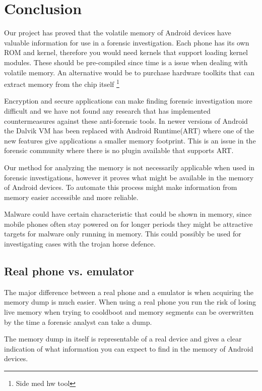 \section{Conclusion}
Our project has proved that the volatile memory of Android devices have valuable information for use 
in a forensic investigation. %
Each phone has its own ROM and kernel, therefore you would need kernels that support loading kernel 
modules. These should be pre-compiled since time is a issue when dealing with volatile memory. An 
alternative would be to purchase hardware toolkits that can extract memory from the chip itself 
\footnote{Side med hw tool} %

Encryption and secure applications can make finding forensic investigation more difficult and we have not found 
any research that has implemented countermeasures against these anti-forensic tools. In newer versions 
of Android the Dalvik VM has been replaced with Android Runtime(ART) where one of the new 
features give applications a smaller memory footprint. This is an issue in the forensic community where there is no 
plugin available that supports ART.

Our method for analyzing the memory is not necessarily applicable when used in forensic investigations, 
however it proves what might be available in the memory of Android devices. 
To automate this process might make information from memory easier accessible and more reliable.

Malware could have certain characteristic that could be shown in memory, since mobile phones often stay 
powered on for longer periods they might be attractive targets for malware only running in memory. 
This could possibly be used for investigating cases with the trojan horse defence.

\subsection{Real phone vs. emulator}
The major difference between a real phone and a emulator is when acquiring the memory dump is much 
easier. When using a real phone you run the risk of losing live memory when trying to cooldboot and 
memory segments can be overwritten by the time a forensic analyst can take a dump.

The memory dump in itself is representable of a real device and gives a clear indication of what 
information you can expect to find in the memory of Android devices.




